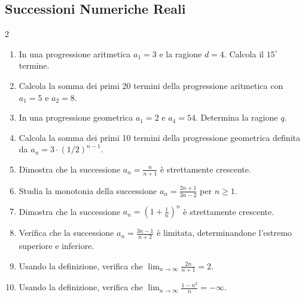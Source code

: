 \subsection{Successioni Numeriche Reali}
\begin{multicols}{2}
\begin{enumerate}
    \item {} In una progressione aritmetica $a_1 = 3$ e la ragione $d = 4$. Calcola il $15^\circ$ termine.
    \item {} Calcola la somma dei primi 20 termini della progressione aritmetica con $a_1 = 5$ e $a_2 = 8$.
    \item {} In una progressione geometrica $a_1 = 2$ e $a_4 = 54$. Determina la ragione $q$.
    \item {} Calcola la somma dei primi 10 termini della progressione geometrica definita da $a_n = 3 \cdot (1/2)^{n-1}$.
    \item {} Dimostra che la successione $a_n = \frac{n}{n+1}$ è strettamente crescente.
    \item {} Studia la monotonia della successione $a_n = \frac{2n+1}{3n-2}$ per $n \ge 1$.
    \item {} Dimostra che la successione $a_n = \left(1+\frac{1}{n}\right)^n$ è strettamente crescente.
    \item {} Verifica che la successione $a_n = \frac{3n-1}{n+2}$ è limitata, determinandone l'estremo superiore e inferiore.
    \item {} Usando la definizione, verifica che $\lim_{n \to \infty} \frac{2n}{n+1} = 2$.
    \item {} Usando la definizione, verifica che $\lim_{n \to \infty} \frac{1-n^2}{n} = -\infty$.
\end{enumerate}
\end{multicols}

